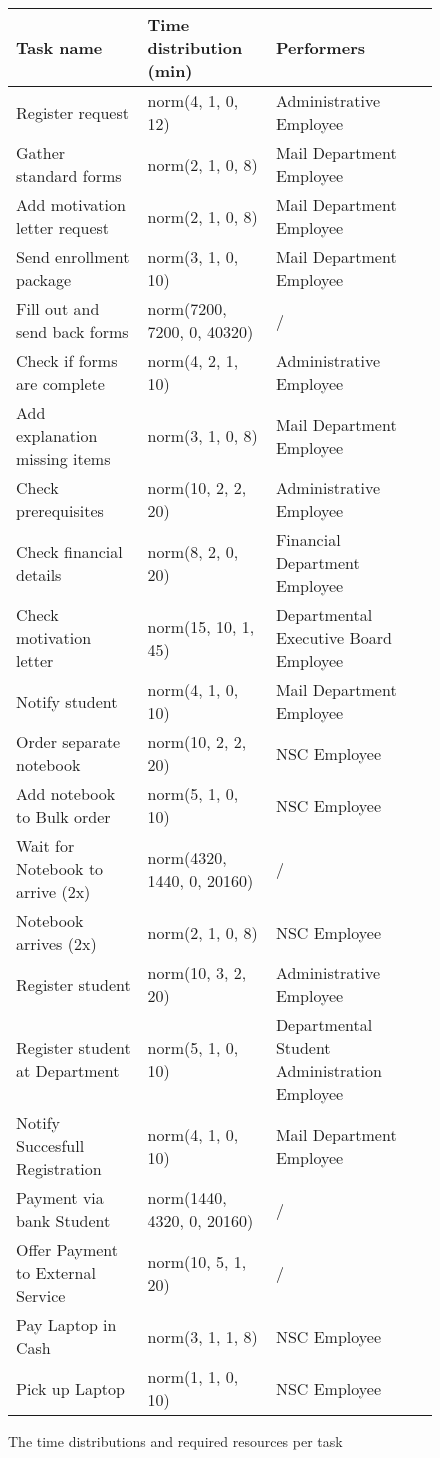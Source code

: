 \begin{figure}[h!]
	\centering
	\begin{tabularx}{\textwidth}{ | X | X | X | }
		\hline
		\textbf{Task name} & \textbf{Time distribution (min)} & \textbf{Performers}\\ \hline\hline
		Register request & norm(4, 1, 0, 12) & Administrative Employee \\ \hline
		Gather standard forms & norm(2, 1, 0, 8) & Mail Department Employee \\ \hline
		Add motivation letter request & norm(2, 1, 0, 8) & Mail Department Employee \\ \hline
		Send enrollment package & norm(3, 1, 0, 10) & Mail Department Employee \\ \hline
		Fill out and send back forms & norm(7200, 7200, 0, 40320) & / \\ \hline
		Check if forms are complete & norm(4, 2, 1, 10) & Administrative Employee \\ \hline
		Add explanation missing items & norm(3, 1, 0, 8) & Mail Department Employee \\ \hline
		Check prerequisites & norm(10, 2, 2, 20) & Administrative Employee \\ \hline
		Check financial details & norm(8, 2, 0, 20) & Financial Department Employee \\ \hline
		Check motivation letter & norm(15, 10, 1, 45) & Departmental Executive Board Employee \\ \hline
		Notify student & norm(4, 1, 0, 10) & Mail Department Employee \\ \hline
		Order separate notebook & norm(10, 2, 2, 20) & NSC Employee \\ \hline
		Add notebook to Bulk order & norm(5, 1, 0, 10) & NSC Employee \\ \hline
		Wait for Notebook to arrive (2x) & norm(4320, 1440, 0, 20160) & / \\ \hline
		Notebook arrives (2x) & norm(2, 1, 0, 8) & NSC Employee \\ \hline
		Register student & norm(10, 3, 2, 20) & 
		Administrative Employee \\ \hline
		Register student at Department & norm(5, 1, 0, 10) & Departmental Student Administration Employee \\ \hline
		Notify Succesfull Registration & norm(4, 1, 0, 10) & Mail Department Employee \\ \hline
		Payment via bank Student & norm(1440, 4320, 0, 20160) & / \\ \hline
		Offer Payment to External Service & norm(10, 5, 1, 20) & / \\ \hline
		Pay Laptop in Cash & norm(3, 1, 1, 8) & NSC Employee \\ \hline
		Pick up Laptop & norm(1, 1, 0, 10) & NSC Employee \\
		\hline
	\end{tabularx}
	\caption{The time distributions and required resources per task}
	\label{fig:tasktimes2}
\end{figure}
